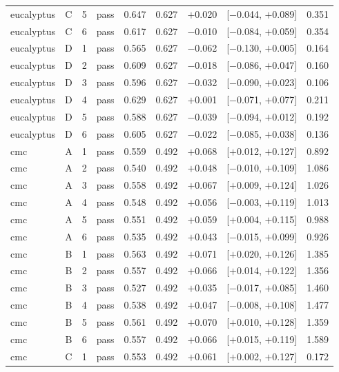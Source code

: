 {\begin{longtable}{lccl rrrcr}
eucalyptus & C & 5 & pass & 0.647 & 0.627 & $+$0.020 & [$-$0.044, $+$0.089] & 0.351 \\
eucalyptus & C & 6 & pass & 0.617 & 0.627 & $-$0.010 & [$-$0.084, $+$0.059] & 0.354 \\
\addlinespace[2pt]
eucalyptus & D & 1 & pass & 0.565 & 0.627 & $-$0.062 & [$-$0.130, $+$0.005] & 0.164 \\
eucalyptus & D & 2 & pass & 0.609 & 0.627 & $-$0.018 & [$-$0.086, $+$0.047] & 0.160 \\
eucalyptus & D & 3 & pass & 0.596 & 0.627 & $-$0.032 & [$-$0.090, $+$0.023] & 0.106 \\
eucalyptus & D & 4 & pass & 0.629 & 0.627 & $+$0.001 & [$-$0.071, $+$0.077] & 0.211 \\
eucalyptus & D & 5 & pass & 0.588 & 0.627 & $-$0.039 & [$-$0.094, $+$0.012] & 0.192 \\
eucalyptus & D & 6 & pass & 0.605 & 0.627 & $-$0.022 & [$-$0.085, $+$0.038] & 0.136 \\
\midrule
cmc & A & 1 & pass & 0.559 & 0.492 & $+$0.068 & [$+$0.012, $+$0.127] & 0.892 \\
cmc & A & 2 & pass & 0.540 & 0.492 & $+$0.048 & [$-$0.010, $+$0.109] & 1.086 \\
cmc & A & 3 & pass & 0.558 & 0.492 & $+$0.067 & [$+$0.009, $+$0.124] & 1.026 \\
cmc & A & 4 & pass & 0.548 & 0.492 & $+$0.056 & [$-$0.003, $+$0.119] & 1.013 \\
cmc & A & 5 & pass & 0.551 & 0.492 & $+$0.059 & [$+$0.004, $+$0.115] & 0.988 \\
cmc & A & 6 & pass & 0.535 & 0.492 & $+$0.043 & [$-$0.015, $+$0.099] & 0.926 \\
\addlinespace[2pt]
cmc & B & 1 & pass & 0.563 & 0.492 & $+$0.071 & [$+$0.020, $+$0.126] & 1.385 \\
cmc & B & 2 & pass & 0.557 & 0.492 & $+$0.066 & [$+$0.014, $+$0.122] & 1.356 \\
cmc & B & 3 & pass & 0.527 & 0.492 & $+$0.035 & [$-$0.017, $+$0.085] & 1.460 \\
cmc & B & 4 & pass & 0.538 & 0.492 & $+$0.047 & [$-$0.008, $+$0.108] & 1.477 \\
cmc & B & 5 & pass & 0.561 & 0.492 & $+$0.070 & [$+$0.010, $+$0.128] & 1.359 \\
cmc & B & 6 & pass & 0.557 & 0.492 & $+$0.066 & [$+$0.015, $+$0.119] & 1.589 \\
\addlinespace[2pt]
cmc & C & 1 & pass & 0.553 & 0.492 & $+$0.061 & [$+$0.002, $+$0.127] & 0.172 \\

\end{longtable}}
